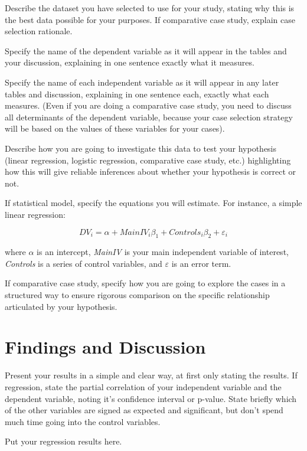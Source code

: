 \documentclass[12pt, oneside]{article}   	%
\begin{document}
Describe the dataset you have selected to use for your study, stating why this is the best data possible for your purposes. If comparative case study, explain case selection rationale.

Specify the name of the dependent variable as it will appear in the tables and your discussion, explaining in one sentence exactly what it measures.

Specify the name of each independent variable as it will appear in any later tables and discussion, explaining in one sentence each, exactly what each measures. (Even if you are doing a comparative case study, you need to discuss all determinants of the dependent variable, because your case selection strategy will be based on the values of these variables for your cases).

Describe how you are going to investigate this data to test your hypothesis (linear regression, logistic regression, comparative case study, etc.) highlighting how this will give reliable inferences about whether your hypothesis is correct or not.

If statistical model, specify the equations you will estimate. For instance, a simple linear regression:

\begin{equation}
DV_{i} = \alpha + MainIV_{i} \beta_1 + Controls_{i} \beta_2  + \varepsilon_{i}
\end{equation}

where $\alpha$ is an intercept, \emph{MainIV} is your main independent variable of interest, \emph{Controls} is a series of control variables, and $\varepsilon$ is an error term.

If comparative case study, specify how you are going to explore the cases in a structured way to ensure rigorous comparison on the specific relationship articulated by your hypothesis.

\section{Findings and Discussion}

Present your results in a simple and clear way, at first only stating the results. If regression, state the partial correlation of your independent variable and the dependent variable, noting it's confidence interval or p-value. State briefly which of the other variables are signed as expected and significant, but don't spend much time going into the control variables.

Put your regression results here.
\end{document}
